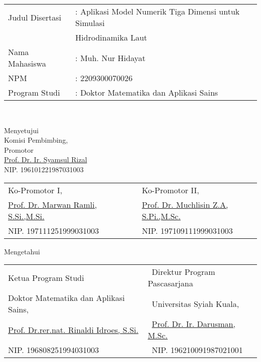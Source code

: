 \setcounter{page}{2}
\vspace{1.5pc}

\begin{center}
	\normalsize
	\noindent
	\begin{tabular}{l l l}
		Judul Disertasi \verb"  " &: Aplikasi Model Numerik Tiga Dimensi untuk Simulasi \\
		& \; Hidrodinamika Laut \\
		Nama Mahasiswa &: Muh. Nur Hidayat \\
		NPM &: 2209300070026 \\
		Program Studi	&: Doktor Matematika dan Aplikasi Sains\\ 
	\end{tabular} \\
\end{center}

\begin{center}
	\vspace{3cm}
	Menyetujui\\
	Komisi Pembimbing, \\
	Promotor \\
	\vspace{2cm}
	\underline{Prof. Dr. Ir. Syamsul Rizal} \\
	NIP. 196101221987031003
	\vspace{1cm}
	
	\begin{tabular}{l l }
		Ko-Promotor I,\verb"                       " & Ko-Promotor II, \verb"            "\\[2.25cm]
		\underline{Prof. Dr. Marwan Ramli, S.Si.,M.Si.} & \underline{Prof. Dr. Muchlisin Z.A, S.Pi.,M.Sc.}\\
		NIP. 197111251999031003 & NIP. 197109111999031003
	\end{tabular}
\end{center}

\begin{center}
	\vspace{0.5cm}
	Mengetahui\\%
	
	\vspace{1cm}
	
	\begin{tabular}{l l }
		Ketua Program Studi\verb"                  " & \verb" "Direktur Program Pascasarjana\\
		Doktor Matematika dan Aplikasi Sains, & \verb" "Universitas Syiah Kuala,\\[2.25cm]
		\underline{Prof. Dr.rer.nat. Rinaldi Idroes, S.Si.} & \verb" "\underline{Prof. Dr. Ir. Darusman, M.Sc.}\\
		NIP. 196808251994031003 & \verb" "NIP. 196210091987021001
	\end{tabular}
\end{center}
%	
